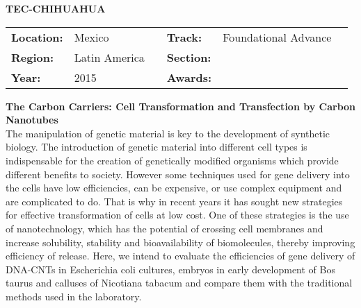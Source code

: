 \textbf{\uppercase{Tec-Chihuahua}}
\FloatBarrier
\begin{table}[h]
\begin{tabular}{lp{2.5cm}llll}
\textbf{Location:} & Mexico & \multicolumn{1}{|l}{} & \textbf{Track:}   & Foundational Advance \\
\textbf{Region:}   & Latin America   & \multicolumn{1}{|l}{} & \textbf{Section:} &  \\
\textbf{Year:}     & 2015   & \multicolumn{1}{|l}{} & \textbf{Awards:}  &
\end{tabular}
\end{table}
\FloatBarrier
\noindent	\textbf{The Carbon Carriers: Cell Transformation and Transfection by Carbon Nanotubes} \vspace{.2cm}\\
The manipulation of genetic material is key to the development of synthetic biology. The introduction of genetic material into different cell types is indispensable for the creation of genetically modified organisms which provide different benefits to society. However some techniques used for gene delivery into the cells have low efficiencies, can be expensive, or use complex equipment and are complicated to do. That is why in recent years it has sought new strategies for effective transformation of cells at low cost. One of these strategies is the use of nanotechnology, which has the potential of crossing cell membranes and increase solubility, stability and bioavailability of biomolecules, thereby improving efficiency of release. Here, we intend to evaluate the efficiencies of gene delivery of DNA-CNTs in Escherichia coli cultures, embryos in early development of Bos taurus and calluses of Nicotiana tabacum and compare them with the traditional methods used in the laboratory.
\vspace{2cm}

